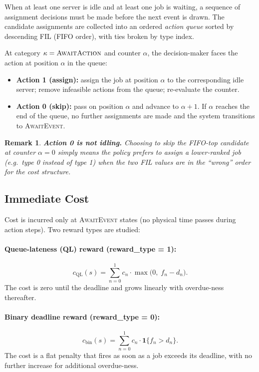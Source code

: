 \documentclass[11pt,a4paper]{article}
\newtheorem{remark}{Remark}
\begin{document}
When at least one server is idle and at least one job is waiting, a
sequence of assignment decisions must be made before the next event is drawn.
The candidate assignments are collected into an ordered \emph{action queue}
sorted by descending FIL (FIFO order), with ties broken by type index.

At category $\kappa = \textsc{AwaitAction}$ and counter $\alpha$, the
decision-maker faces the action at position $\alpha$ in the queue:
\begin{itemize}
  \item \textbf{Action 1 (assign):} assign the job at position $\alpha$ to the
        corresponding idle server; remove infeasible actions from the queue;
        re-evaluate the counter.
  \item \textbf{Action 0 (skip):} pass on position $\alpha$ and advance to
        $\alpha + 1$.  If $\alpha$ reaches the end of the queue, no further
        assignments are made and the system transitions to \textsc{AwaitEvent}.
\end{itemize}

\begin{remark}
\textbf{Action 0 is not idling.}  Choosing to skip the FIFO-top candidate
at counter $\alpha = 0$ simply means the policy prefers to assign a
lower-ranked job (e.g.\ type 0 instead of type 1) when the two FIL values
are in the ``wrong'' order for the cost structure.
\end{remark}

\subsection{Immediate Cost}

Cost is incurred only at \textsc{AwaitEvent} states (no physical time passes
during action steps).  Two reward types are studied:

\paragraph{Queue-lateness (QL) reward (reward\_type = 1):}
\begin{equation}
  c_\text{QL}(s)
    = \sum_{n=0}^{1} c_n \cdot \max\!\bigl(0,\; f_n - d_n\bigr).
  \label{eq:ql_cost}
\end{equation}
The cost is zero until the deadline and grows linearly with overdue-ness
thereafter.

\paragraph{Binary deadline reward (reward\_type = 0):}
\begin{equation}
  c_\text{bin}(s)
    = \sum_{n=0}^{1} c_n \cdot \mathbf{1}\!\bigl\{f_n > d_n\bigr\}.
  \label{eq:bin_cost}
\end{equation}
The cost is a flat penalty that fires as soon as a job exceeds its deadline,
with no further increase for additional overdue-ness.
\end{document}
